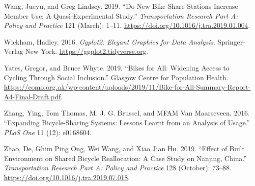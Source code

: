 \documentclass[]{article}
\begin{document}
\leavevmode\hypertarget{ref-wang_new_2019}{}%
Wang, Jueyu, and Greg Lindsey. 2019. ``Do New Bike Share Stations Increase Member Use: A Quasi-Experimental Study.'' \emph{Transportation Research Part A: Policy and Practice} 121 (March): 1--11. \url{https://doi.org/10.1016/j.tra.2019.01.004}.

\leavevmode\hypertarget{ref-ggplot2}{}%
Wickham, Hadley. 2016. \emph{Ggplot2: Elegant Graphics for Data Analysis}. Springer-Verlag New York. \url{https://ggplot2.tidyverse.org}.

\leavevmode\hypertarget{ref-yates_bikes_2019}{}%
Yates, Gregor, and Bruce Whyte. 2019. ``Bikes for All: Widening Access to Cycling Through Social Inclusion.'' Glasgow Centre for Population Health. \url{https://como.org.uk/wp-content/uploads/2019/11/Bike-for-All-Summary-Report-A4-Final-Draft.pdf}.

\leavevmode\hypertarget{ref-zhang_expanding_2016}{}%
Zhang, Ying, Tom Thomas, M. J. G. Brussel, and MFAM Van Maarseveen. 2016. ``Expanding Bicycle-Sharing Systems: Lessons Learnt from an Analysis of Usage.'' \emph{PLoS One} 11 (12): e0168604.

\leavevmode\hypertarget{ref-zhao_effect_2019}{}%
Zhao, De, Ghim Ping Ong, Wei Wang, and Xiao Jian Hu. 2019. ``Effect of Built Environment on Shared Bicycle Reallocation: A Case Study on Nanjing, China.'' \emph{Transportation Research Part A: Policy and Practice} 128 (October): 73--88. \url{https://doi.org/10.1016/j.tra.2019.07.018}.
\end{document}
